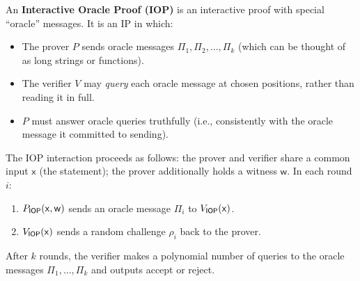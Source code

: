 \documentclass[11pt]{article}
\begin{document}
\begin{defbox}
An \textbf{Interactive Oracle Proof (IOP)} is an interactive proof with special
``oracle'' messages. It is an IP in which:
\begin{itemize}
  \item The prover $P$ sends oracle messages $\Pi_1, \Pi_2, \ldots, \Pi_k$
    (which can be thought of as long strings or functions).
  \item The verifier $V$ may \emph{query} each oracle message at chosen
    positions, rather than reading it in full.
  \item $P$ must answer oracle queries truthfully (i.e., consistently with the
    oracle message it committed to sending).
\end{itemize}
\end{defbox}

The IOP interaction proceeds as follows: the prover and verifier share a common
input $\mathsf{x}$ (the statement); the prover additionally holds a witness
$\mathsf{w}$. In each round $i$:
\begin{enumerate}
  \item $P_{\mathsf{IOP}}(\mathsf{x}, \mathsf{w})$ sends an oracle message $\Pi_i$
    to $V_{\mathsf{IOP}}(\mathsf{x})$.
  \item $V_{\mathsf{IOP}}(\mathsf{x})$ sends a random challenge $\rho_i$ back to the
    prover.
\end{enumerate}
After $k$ rounds, the verifier makes a polynomial number of queries to the
oracle messages $\Pi_1, \ldots, \Pi_k$ and outputs accept or reject.
\end{document}
